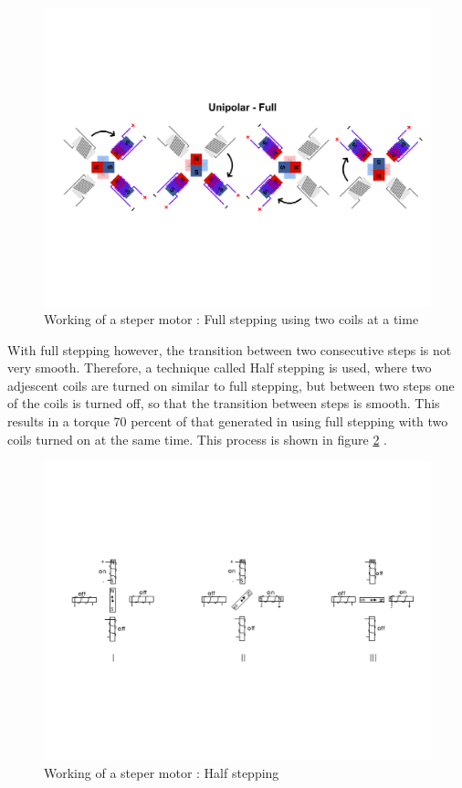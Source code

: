 \documentclass[sigconf]{acmart}
\begin{document}
\begin{figure}[!ht]
  \centering\includegraphics[width=\columnwidth]{images/stepper2.pdf}
  \caption{Working of a steper motor : Full stepping using two coils at a time \cite{stepper2}}\label{f:stepper2}
\end{figure}

With full stepping however, the transition between two consecutive steps is not very smooth. Therefore, a technique called Half stepping is used, where two adjescent coils are turned on similar to full stepping, but between two steps one of the coils is turned off, so that the transition between steps is smooth. This results in a torque 70 percent of that generated in using full stepping with two coils turned on at the same time. This process is shown in figure \ref{f:stepper3} \cite{stepper1}.

\begin{figure}[!ht]
  \centering\includegraphics[width=\columnwidth]{images/stepper3.pdf}
  \caption{Working of a steper motor : Half stepping \cite{stepper1}}\label{f:stepper3}
\end{figure}
\end{document}
